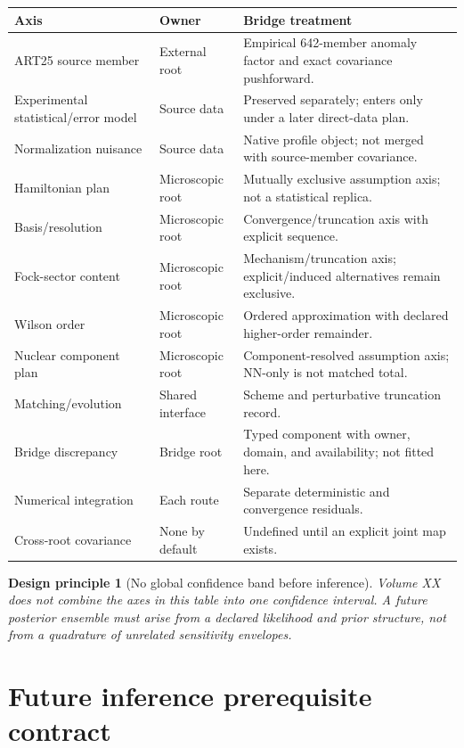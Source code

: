 \documentclass[11pt]{article}
\newtheorem{principle}[definition]{Design principle}
\begin{document}
\begin{longtable}{L{0.26\textwidth}L{0.28\textwidth}L{0.37\textwidth}}
\toprule
Axis & Owner & Bridge treatment\\
\midrule
\endhead
ART25 source member & External root & Empirical 642-member anomaly factor and exact covariance pushforward.\\
Experimental statistical/error model & Source data & Preserved separately; enters only under a later direct-data plan.\\
Normalization nuisance & Source data & Native profile object; not merged with source-member covariance.\\
Hamiltonian plan & Microscopic root & Mutually exclusive assumption axis; not a statistical replica.\\
Basis/resolution & Microscopic root & Convergence/truncation axis with explicit sequence.\\
Fock-sector content & Microscopic root & Mechanism/truncation axis; explicit/induced alternatives remain exclusive.\\
Wilson order & Microscopic root & Ordered approximation with declared higher-order remainder.\\
Nuclear component plan & Microscopic root & Component-resolved assumption axis; NN-only is not matched total.\\
Matching/evolution & Shared interface & Scheme and perturbative truncation record.\\
Bridge discrepancy & Bridge root & Typed component with owner, domain, and availability; not fitted here.\\
Numerical integration & Each route & Separate deterministic and convergence residuals.\\
Cross-root covariance & None by default & Undefined until an explicit joint map exists.\\
\bottomrule
\end{longtable}

\begin{principle}[No global confidence band before inference]
Volume XX does not combine the axes in this table into one confidence interval.  A future posterior ensemble must arise from a declared likelihood and prior structure, not from a quadrature of unrelated sensitivity envelopes.
\end{principle}

\section{Future inference prerequisite contract}
\label{sec:future-inference}
\end{document}
